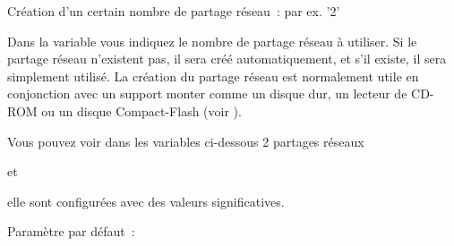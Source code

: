 \begin{description}

    Création d'un certain nombre de partage réseau~: par ex. '2'

        Dans la variable  vous indiquez le nombre de partage
        réseau à utiliser. Si le partage réseau n'existent pas, il sera créé
        automatiquement, et s'il existe, il sera simplement utilisé. La création
        du partage réseau est normalement utile en conjonction avec un support
        monter comme un disque dur, un lecteur de CD-ROM ou un disque Compact-Flash
        (voir ).

        Vous pouvez voir dans les variables ci-dessous 2 partages réseaux






        et






        elle sont configurées avec des valeurs significatives.

        Paramètre par défaut~: 

\end{description}


